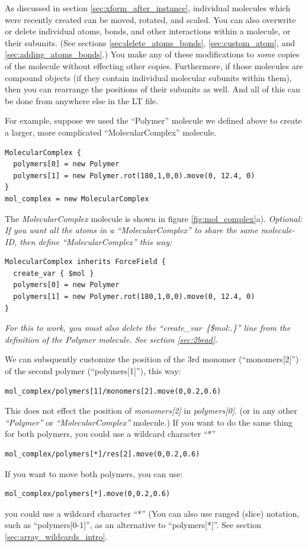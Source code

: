 \documentclass[11pt]{article}
\begin{document}
As discussed in section \ref{sec:xform_after_instance},
individual molecules which were recently created
can be moved, rotated, and scaled.
You can also overwrite or delete individual atoms, 
bonds, and other interactions within a molecule, or their subunits.
(See sections 
\ref{sec:delete_atoms_bonds}, 
\ref{sec:custom_atom}, and \ref{sec:adding_atoms_bonds}.)
You make any of these modifications to \textit{some} copies 
of the molecule without effecting other copies.
Furthermore, if those molecules are compound objects 
(if they contain individual molecular subunits within them),
then you can rearrange the positions of their subunits as well.
And all of this can be done from anywhere else in the LT file.

For example, suppose we used the ``Polymer'' molecule we defined above
to create a larger, more complicated ``MolecularComplex'' molecule.
\begin{verbatim}
MolecularComplex {
  polymers[0] = new Polymer
  polymers[1] = new Polymer.rot(180,1,0,0).move(0, 12.4, 0)
}
mol_complex = new MolecularComplex
\end{verbatim}
The \textit{MolecularComplex} molecule is shown in figure \ref{fig:mol_complex}a). 
\textit{Optional: If you want all the atoms in a ``MolecularComplex'' to share the same molecule-ID,
then define ``MolecularComplex'' this way:}
\begin{verbatim}
MolecularComplex inherits ForceField {
  create_var { $mol }
  polymers[0] = new Polymer
  polymers[1] = new Polymer.rot(180,1,0,0).move(0, 12.4, 0)
}
\end{verbatim}
\textit{For this to work, you must also delete the 
 \mbox{\textit{``create\_var \{\$mol:.\}''}} line from
 the definition of the Polymer molecule. See section \ref{sec:2bead}.}


We can subsquently customize the position of the 3rd monomer (``monomers[2]'')
of the second polymer (``polymers[1]''), this way:
\begin{verbatim}
mol_complex/polymers[1]/monomers[2].move(0,0.2,0.6)
\end{verbatim}

This does not effect the position of
\textit{monomers[2]} in \textit{polymers[0]}.
(or in any other \textit{``Polymer''} or
\textit{``MolecularComplex''} molecule.)
If you want to do the same thing for both polymers,
you could use a wildcard character ``*''
\begin{verbatim}
mol_complex/polymers[*]/res[2].move(0,0.2,0.6)
\end{verbatim}
If you want to move both polymers, you can use:
\begin{verbatim}
mol_complex/polymers[*].move(0,0.2,0.6)
\end{verbatim}
you could use a wildcard character ``*''
(You can also use ranged (slice) notation, such as ``polymers[0-1]'',
 as an alternative to ``polymers[*]''. 
See section \ref{sec:array_wildcards_intro}.
\end{document}
